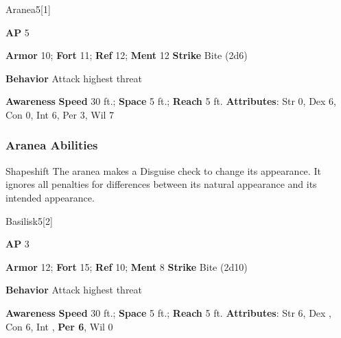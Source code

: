 \begin{monsection}{Aranea}{5}[1]
\vspace{-1em}\vspace{-1em}
\begin{spellcontent}
\begin{spelltargetinginfo}
{\textbf{AP} 5}

\pari \textbf{Armor} 10;
\textbf{Fort} 11;
\textbf{Ref} 12;
\textbf{Ment} 12
\pari \textbf{Strike} Bite  (2d6)



\pari \textbf{Behavior} Attack highest threat
\end{spelltargetinginfo}
\end{spellcontent}

\begin{monsterfooter}
\pari \textbf{Awareness} 
\pari \textbf{Speed} 30 ft.;
\textbf{Space} 5 ft.;
\textbf{Reach} 5 ft.
\pari \textbf{Attributes}:
Str 0,
Dex 6,
Con 0,
Int 6,
Per 3,
Wil 7
\end{monsterfooter}
\end{monsection}


\subsubsection{Aranea Abilities}

\begin{ability}{Shapeshift}
The aranea makes a Disguise check to change its appearance.
It ignores all penalties for differences between its natural appearance and its intended appearance.
\end{ability}

\begin{monsection}{Basilisk}{5}[2]
\vspace{-1em}\vspace{-1em}
\begin{spellcontent}
\begin{spelltargetinginfo}
{\textbf{AP} 3}

\pari \textbf{Armor} 12;
\textbf{Fort} 15;
\textbf{Ref} 10;
\textbf{Ment} 8
\pari \textbf{Strike} Bite  (2d10)



\pari \textbf{Behavior} Attack highest threat
\end{spelltargetinginfo}
\end{spellcontent}

\begin{monsterfooter}
\pari \textbf{Awareness} 
\pari \textbf{Speed} 30 ft.;
\textbf{Space} 5 ft.;
\textbf{Reach} 5 ft.
\pari \textbf{Attributes}:
Str 6,
Dex ,
Con 6,
Int ,
\textbf{Per 6},
Wil 0
\end{monsterfooter}
\end{monsection}


